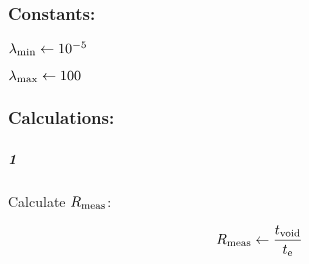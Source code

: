 \subsubsection*{Constants:}
\begin{multicols}{3}
  \begin{packed_item}
    \item $\lambda_\text{min} \leftarrow 10^{-5}$
    \item  $\lambda_\text{max} \leftarrow 100$ 
    \end{packed_item}
  \end{multicols}
\subsubsection*{Calculations:}

\subparagraph{1}
Calculate $R_\text{meas}$:\vspace*{-4ex}
\begin{algorithmic}
  \State  \[ R_\text{meas} \leftarrow \frac{t_\text{void}}{t_\text{e}} \]
\end{algorithmic}

